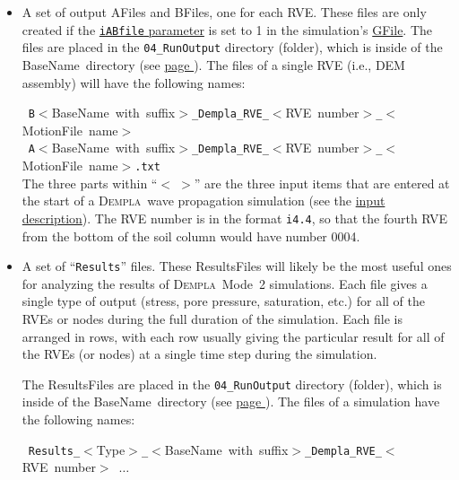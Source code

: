 \documentclass[letterpaper,11pt]{article}
\newcommand{\Dempla}{\textsc{Dempla}}
\newcommand{\BaseName}{\textsf{BaseName}}
\newcommand{\AFile}{\textsf{AFile}}
\newcommand{\BFile}{\textsf{BFile}}
\newcommand{\GFile}{\textsf{GFile}}
\newcommand{\MotionFile}{\textsf{MotionFile}}
\newcommand{\ResultsFile}{\textsf{ResultsFile}}
\begin{document}
\begin{itemize}
  items that are entered at the start of a \Dempla\ wave
  propagation simulation
  (see the \hyperref[par:input]{input description}).
  The RVE number is in the format \texttt{i4.4}, so that the
  fourth RVE from the bottom of the soil column would have
  number 0004.
%
  \item
  A set of output \AFile s and \BFile s, one for each RVE.
  These files are only created if the
  \hyperref[sec:iABfile]{\texttt{iABfile} parameter} is set to 1
  in the simulation's
  \hyperref[sec:GFiles]{\GFile}.
  The files are placed in the \texttt{04\_RunOutput}
  directory (folder), which is inside of the  \BaseName\ directory
  (see \hyperref[item:BaseNameDirectory]{page \pageref*{item:BaseNameDirectory}}).
  The files of a single RVE (i.e., DEM assembly)
  will have the following names:
  \par
  \mbox{%
  	\texttt{B}$<$\BaseName\ with suffix$>$\texttt{\_Dempla\_RVE\_}$<$RVE number$>$\texttt{\_}$<$\MotionFile\ name$>$}\\[0.5ex]
  \mbox{%
  \texttt{A}$<$\BaseName\ with suffix$>$\texttt{\_Dempla\_RVE\_}$<$RVE number$>$\texttt{\_}$<$\MotionFile\ name$>$}\texttt{.txt}\\[0.5ex]
%
  The three parts within ``$<\;>$'' are the three input
  items that are entered at the start of a \Dempla\ wave
  propagation simulation
  (see the \hyperref[par:input]{input description}).
  The RVE number is in the format \texttt{i4.4}, so that the
  fourth RVE from the bottom of the soil column would have
  number 0004.
%
  \item
  A set of ``\texttt{Results}'' files.
  These \ResultsFile s will likely be the most useful ones for analyzing
  the results of \Dempla\ Mode~2 simulations.
  Each file gives a single type of output (stress, pore pressure,
  saturation, etc.) for all of the RVEs or nodes during the full
  duration of the simulation.
  Each file is arranged in rows, with each row usually giving the
  particular result for all of the RVEs (or nodes) at a single
  time step during the simulation.
  \par
  The \ResultsFile s are placed in the \texttt{04\_RunOutput}
  directory (folder), which is inside of the  \BaseName\ directory
  (see \hyperref[item:BaseNameDirectory]{page \pageref*{item:BaseNameDirectory}}).
  The files of a simulation have the following names:
  \par
  \mbox{%
  	\texttt{Results\_}$<$Type$>$\texttt{\_}$<$\BaseName\ with suffix$>$\texttt{\_Dempla\_RVE\_}$<$RVE number$>$ $\ldots$}\\

\end{itemize}
\end{document}
